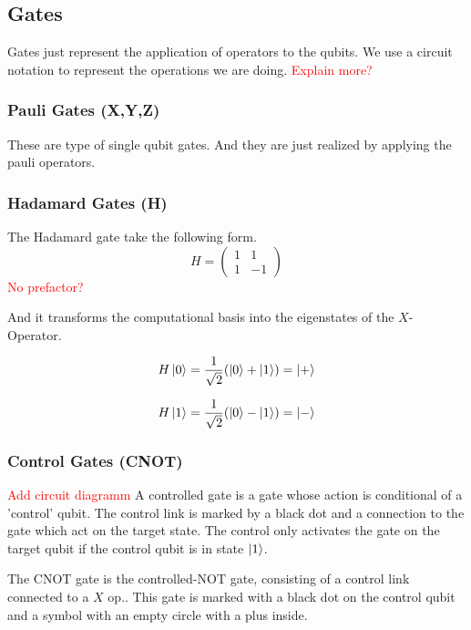 \subsection{Gates}\label{sec:basic.math.gates}
Gates just represent the application of operators to the qubits. 
We use a circuit notation to represent the operations we are doing.
\textcolor{red}{Explain more?}


\subsubsection{Pauli Gates (X,Y,Z)}\label{sec:basic.math.gates.paui}
These are type of single qubit gates. And they are just realized by applying the pauli operators. 


\subsubsection{Hadamard Gates (H)}\label{sec:basic.math.gates.hadamard}
The Hadamard gate take the following form.
\begin{equation}
H=    
\begin{pmatrix}
1 & 1  \\
1 & -1  
\end{pmatrix}
\end{equation}
\textcolor{red}{No prefactor?}

And it transforms the computational basis into the eigenstates of the $X$-Operator.

\begin{equation}
    H\ket{0} = \frac{1}{\sqrt{2}} (\ket{0} + \ket{1}) = \ket{+}
\end{equation}

\begin{equation}
    H\ket{1} = \frac{1}{\sqrt{2}} (\ket{0} - \ket{1}) = \ket{-}
\end{equation}
\cite{QECintro}


\subsubsection{Control Gates (CNOT)}\label{sec:basic.math.gates.cnot}
\textcolor{red}{Add circuit diagramm}
A controlled gate is a gate whose action is conditional of a 'control' qubit.
The control link is marked by a black dot and a connection to the gate which act on the target state. 
The control only activates the gate on the target qubit if the control qubit is in state $\ket{1}$.

The CNOT gate is the controlled-NOT gate, consisting of a control link connected to a $X$ op.. 
This gate is marked with a black dot on the control qubit and a symbol with an empty circle with a plus inside.


